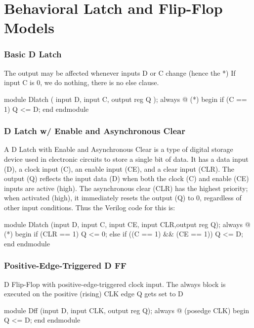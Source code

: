 \documentclass[12pt,openany]{book}
\begin{document}
\section{Behavioral Latch and
Flip-Flop Models}
\subsubsection{Basic D Latch}
The output may be affected whenever inputs D or C change (hence the *)
If input C is 0, we do nothing, there is no else clause.
\begin{vhdl}
module Dlatch (
	input D,
	input C,
	output reg Q
	);
	always @ (*)
	begin
		if (C == 1)
		Q <= D;
	end
endmodule
\end{vhdl}
\vspace*{5px}
\subsubsection{D Latch w/ Enable and Asynchronous Clear}
A D Latch with Enable and Asynchronous Clear is a type of digital storage device used in electronic circuits to store a single bit of data. It has a data input (D), a clock input (C), an enable input (CE), and a clear input (CLR). The output (Q) reflects the input data (D) when both the clock (C) and enable (CE) inputs are active (high). The asynchronous clear (CLR) has the highest priority; when activated (high), it immediately resets the output (Q) to 0, regardless of other input conditions.
Thus the Verilog code for this is:
\begin{vhdl}
module Dlatch (input D, input C, input CE, input CLR,output reg Q);
	always @ (*)
	begin
		if (CLR == 1)
			Q <= 0;
		else if ((C == 1) && (CE == 1))
			Q <= D;
	end
endmodule
\end{vhdl}

\subsubsection{Positive-Edge-Triggered D FF}
D Flip-Flop with positive-edge-triggered clock input. The always block is executed on the positive (rising) CLK edge Q gets set to D
\newline
\begin{vhdl}
module Dff (input D, input CLK, output reg Q);
	always @ (posedge CLK)
		begin
			Q <= D;
		end
endmodule
\end{vhdl}
\end{document}
